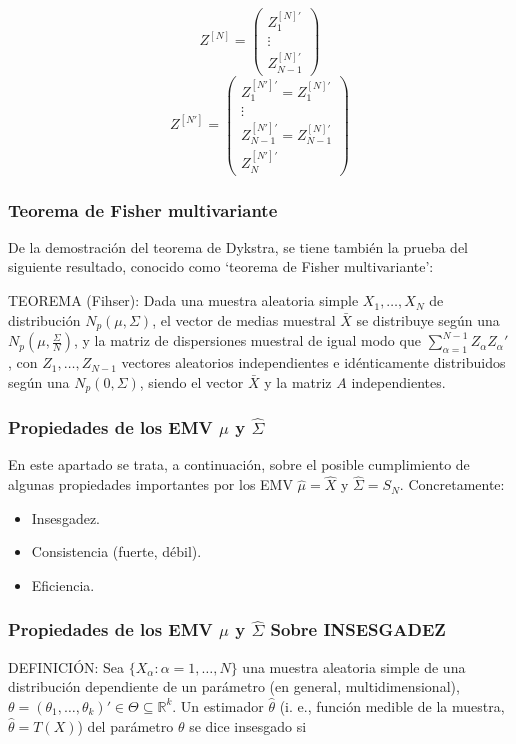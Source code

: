 \documentclass[11pt,a4paper]{article}
\begin{document}
\begin{itemize}
\begin{itemize}
$$Z^{[N]} = \begin{pmatrix}
Z_{1}^{[N]'} \\ \vdots \\ Z_{N-1}^{[N]'}
\end{pmatrix}$$
$$Z^{[N']} = \begin{pmatrix}
Z_{1}^{[N']'} = Z_{1}^{[N]'} \\ \vdots \\ Z_{N-1}^{[N']'} = Z_{N-1}^{[N]'} \\ Z_{N}^{[N']'}
\end{pmatrix}$$
\end{itemize}
\end{itemize}

\subsubsection{Teorema de Fisher multivariante}
De la demostración del teorema de Dykstra, se tiene también la prueba del siguiente resultado, conocido como `teorema de Fisher multivariante':

TEOREMA (Fihser): Dada una muestra aleatoria simple $X_{1}, \dots, X_{N}$ de distribución $N_{p}(\mu, \Sigma)$, el vector de medias muestral $\bar{X}$ se distribuye según una $N_{p}(\mu, \frac{\Sigma}{N})$, y la matriz de dispersiones muestral de igual modo que $\sum_{\alpha=1}^{N-1}Z_{\alpha}Z_{\alpha}'$, con $Z_{1}, \dots, Z_{N-1}$ vectores aleatorios independientes e idénticamente distribuidos según una $N_{p}(0, \Sigma)$, siendo el vector $\bar{X}$ y la matriz $A$ independientes.

\subsubsection{Propiedades de los EMV \texorpdfstring{$\hat{\mu}$}) y \texorpdfstring{$\hat{\Sigma}$})}
En este apartado se trata, a continuación, sobre el posible cumplimiento de algunas propiedades importantes por los EMV $\hat{\mu} = \hat{X}$ y $\hat{\Sigma} = S_{N}$. Concretamente:
\begin{itemize}
\item Insesgadez.
\item Consistencia (fuerte, débil).
\item Eficiencia.
\end{itemize}

\subsubsection{Propiedades de los EMV \texorpdfstring{$\hat{\mu}$}) y \texorpdfstring{$\hat{\Sigma}$}) Sobre INSESGADEZ}
DEFINICIÓN: Sea $\{X_{\alpha}: \alpha=1, \ldots, N\}$ una muestra aleatoria simple de una distribución dependiente de un parámetro (en general, multidimensional), $\theta = (\theta_{1}, \ldots, \theta_{k})' \in \Theta \subseteq \mathbb{R}^{k}$. Un estimador $\hat{\theta}$ (i. e., función medible de la muestra, $\hat{\theta} = T(X)$) del parámetro $\theta$ se dice insesgado si
\end{document}
